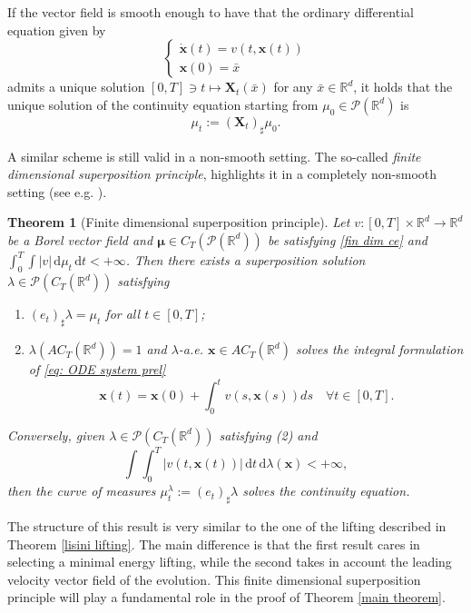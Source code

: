 \documentclass[10pt,leqno]{amsart}
\numberwithin{equation}{section}
\newtheorem{teorema}{Theorem}[section]
\newcommand{\R}{\mathbb{R}}
\newcommand{\PP}{\mathcal{P}}
\renewcommand{\d}{\mathrm{d}}
\begin{document}
If the vector field is smooth enough to have that the ordinary differential equation given by 
\begin{equation}\label{eq: ODE system prel}
    \begin{cases}
        \dot{\boldsymbol{x}}(t) = v(t,\boldsymbol{x}(t))
        \\
        \boldsymbol{x}(0) = \bar{x}
    \end{cases}
\end{equation}
admits a unique solution $[0,T] \ni t\mapsto \boldsymbol{X}_t(\bar{x})$ for any $\bar{x}\in \R^d$, it holds that the unique solution of the continuity equation starting from $\mu_0\in \PP(\R^d)$ is 
\begin{equation}
    \mu_t := (\boldsymbol{X}_t)_\sharp\mu_0.
\end{equation}

A similar scheme is still valid in a non-smooth setting. The so-called \textit{finite dimensional superposition principle}, highlights it in a completely non-smooth setting (see e.g. \cite{ambcri06}).

\begin{teorema}[Finite dimensional superposition principle]\label{finite dim superposition principle}
    Let $v:[0,T]\times \R^d \to \R^d$ be a Borel vector field and $\boldsymbol{\mu}\in C_T(\PP(\R^d))$ be satisfying \eqref{fin dim ce} and $\int_0^T \int |v| \,\d\mu_t \,\d t<+\infty$. Then there exists a \textit{superposition solution} $\lambda\in \PP(C_T(\R^d))$ satisfying
    \begin{enumerate}
        \item $(e_t)_\sharp\lambda= \mu_t$ for all $t\in [0,T]$;
        \item $\lambda(AC_T(\R^d)) = 1$ and $\lambda$-a.e. $\boldsymbol{x}\in AC_T(\R^d)$ solves the integral formulation of \eqref{eq: ODE system prel}
        \[\boldsymbol{x}(t) = \boldsymbol{x}(0) + \int_0^t v(s,\boldsymbol{x}(s)) ds \quad \forall t\in [0,T].\]
    \end{enumerate}
    Conversely, given $\lambda\in \PP(C_T(\R^d))$ satisfying (2) and 
    \[ \int \int_0^T |v(t,\boldsymbol{x}(t))| \,\d t \,\d\lambda(\boldsymbol{x})<+\infty,\] 
    then the curve of measures $\mu_t^{\lambda}:= (e_t)_{\sharp}\lambda$ solves the continuity equation.
\end{teorema}


The structure of this result is very similar to the one of the lifting described in Theorem \ref{lisini lifting}. The main difference is that the first result cares in selecting a minimal energy lifting, while the second takes in account the leading velocity vector field of the evolution. This finite dimensional superposition principle will play a fundamental role in the proof of Theorem \ref{main theorem}.
\end{document}
